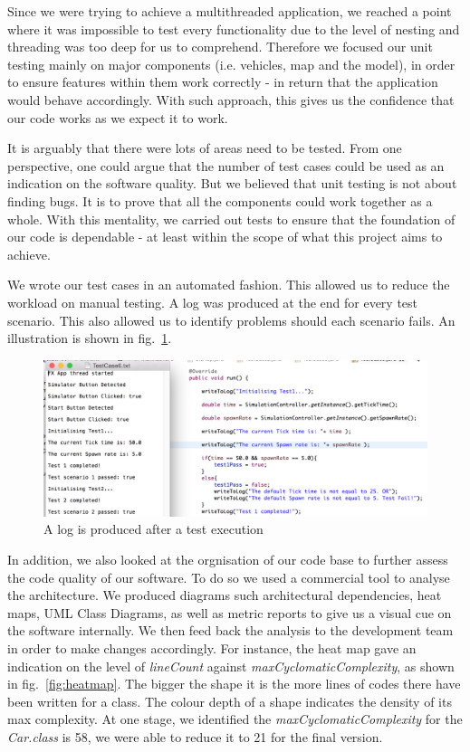 Since we were trying to achieve a multithreaded application, we reached a point where it was impossible to test every functionality due to the level of nesting and threading was too deep for us to comprehend. Therefore we focused our unit testing mainly on major components (i.e. vehicles, map and the model), in order to ensure features within them work correctly - in return that the application would behave accordingly. With such approach, this gives us the confidence that our code works as we expect it to work. 

It is arguably that there were lots of areas need to be tested. From one perspective, one could argue that the number of test cases could be used as an indication on the software quality. But we believed that unit testing is not about finding bugs. It is to prove that all the components could work together as a whole.  With this mentality, we carried out tests to ensure that the foundation of our code is dependable - at least within the scope of what this project aims to achieve.  

We wrote our test cases in an automated fashion. This allowed us to reduce the workload on manual testing.  A log was produced at the end for every test scenario. This also allowed us to identify problems should each scenario fails. An illustration is shown in fig.~\ref{fig:testCase}. 

\begin{figure}[h]
	\begin{center}
		\includegraphics[width=\textwidth]{img/testCase.png}
		\caption{A log is produced after a test execution}
		\label{fig:testCase}
	\end{center}
\end{figure}

In addition, we also looked at the orgnisation of our code base to further assess the code quality of our software.  To do so we used a commercial tool to analyse the architecture. We produced diagrams such architectural dependencies, heat maps, UML Class Diagrams, as well as metric reports to give us a visual cue on the software internally. We then feed back the analysis to the development team in order to make changes accordingly. For instance, the heat map gave an indication on the level of \textit{lineCount} against \textit{maxCyclomaticComplexity}, as shown in fig.~\ref{fig:heatmap}. The bigger the shape it is the more lines of codes there have been written for a class. The colour depth of a shape indicates the density of its max complexity. At one stage, we identified the \textit{maxCyclomaticComplexity} for the \textit{Car.class} is 58, we were able to reduce it to 21 for the final version.     

